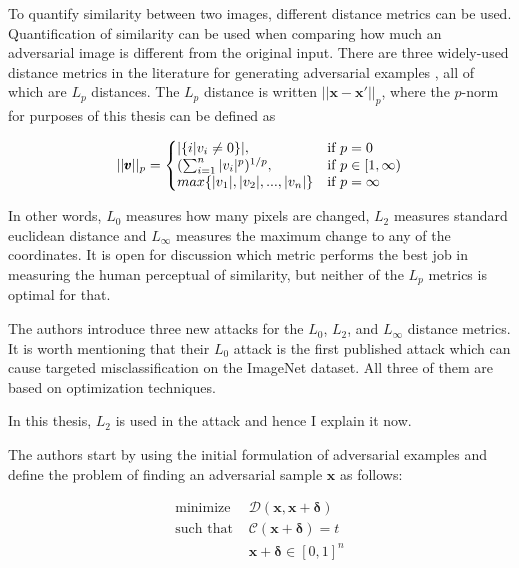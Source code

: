 
To quantify similarity between two images, different distance metrics can be used. Quantification of similarity can be used when comparing how much an adversarial image is different from the original input. There are three widely-used distance metrics in the literature for generating adversarial examples , all of which are $L_p$ distances. The $L_p$ distance is written $||\pmb x - \pmb x'||_p$, where the $p$-norm for purposes of this thesis can be defined as

\begin{equation}
  ||\pmb v||_p=\left\{
  \begin{array}{@{}ll@{}}
       |\{i | v_i \neq 0 \}|, & \text{if } p = 0 \\
    ( \sum_{i = 1}^{n} |v_i|^p)^{1/p}, & \text{if } p \in [1, \infty) \\
    max\{|v_1|, |v_2|, ..., |v_n|\} & \text{if } p = \infty
  \end{array}\right.
\end{equation} 

In other words, $L_0$ measures how many pixels are changed, $L_2$ measures standard euclidean distance and $L_\infty$ measures the maximum change to any of the coordinates. It is open for discussion which metric performs the best job in measuring the human perceptual of similarity, but neither of the $L_p$ metrics is optimal for that.


The authors \cite{DBLP:journals/corr/CarliniW16a} introduce three new attacks for the $L_0$, $L_2$, and $L_{ \infty }$ distance metrics. It is worth mentioning that their $L_0$ attack is the first published attack which can cause targeted misclassification on the ImageNet dataset. All three of them are based on optimization techniques.

In this thesis, $L_2$ is used in the attack and hence I explain it now.

The authors start by using the initial formulation of adversarial examples \cite{szegedy2013intriguing} and define the problem of finding an adversarial sample $\pmb x$ as follows:

\begin{align*}
\text{minimize } & \mathcal{D}(\pmb x, \pmb x + \pmb \delta) \\
\text{such that } & \mathcal{C} (\pmb x + \pmb \delta) = t \\
                  & \pmb x + \pmb \delta \in [0, 1]^n
\end{align*}

